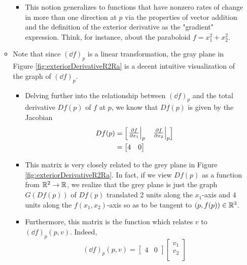 \documentclass[../notes.tex]{subfiles}
\begin{document}
\begin{itemize}
\begin{itemize}
\begin{itemize}
\begin{itemize}
            \end{itemize}
            \item This notion generalizes to functions that have nonzero rates of change in more than one direction at $p$ via the properties of vector addition and the definition of the exterior derivative as the "gradient" expression. Think, for instance, about the paraboloid $f=x_1^2+x_2^2$.
        \end{itemize}
        \item Note that since $(\dd{f})_p$ is a linear transformation, the gray plane in Figure \ref{fig:exteriorDerivativeR2Ra} is a decent intuitive visualization of the graph of $(\dd{f})_p$.
        \begin{itemize}
            \item Delving further into the relationship between $(\dd{f})_p$ and the total derivative $Df(p)$ of $f$ at $p$, we know that $Df(p)$ is given by the Jacobian
            \begin{align*}
                Df(p) &=
                \begin{bmatrix}
                    \eval{\pdv{f}{x_1}}_p & \eval{\pdv{f}{x_2}}_p
                \end{bmatrix}\\
                &=
                \begin{bmatrix}
                    4 & 0
                \end{bmatrix}
            \end{align*}
            \item This matrix is very closely related to the grey plane in Figure \ref{fig:exteriorDerivativeR2Ra}. In fact, if we view $Df(p)$ as a function from $\mathbb{R}^2\to\mathbb{R}$, we realize that the grey plane is just the graph $G(Df(p))$ of $Df(p)$ translated 2 units along the $x_1$-axis and 4 units along the $f(x_1,x_2)$-axis so as to be tangent to $(p,f(p))\in\mathbb{R}^3$.
            \item Furthermore, this matrix is the function which relates $v$ to $(\dd{f})_p(p,v)$. Indeed,
            \begin{equation*}
                (\dd{f})_p(p,v) =
                \begin{bmatrix}
                    4 & 0
                \end{bmatrix}
                \begin{bmatrix}
                    v_1\\
                    v_2\\

\end{bmatrix}
\end{equation*}
\end{itemize}
\end{itemize}
\end{itemize}
\end{document}
